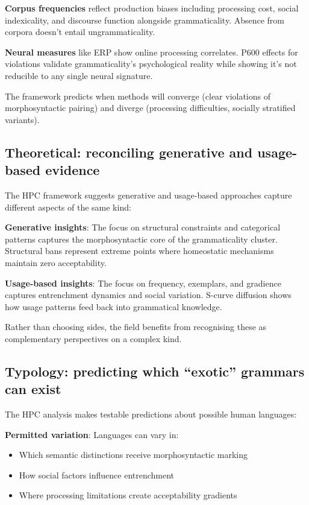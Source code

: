\documentclass[12pt]{article}
\begin{document}
\textbf{Corpus frequencies} reflect production biases including processing cost, social indexicality, and discourse function alongside grammaticality. Absence from corpora doesn't entail ungrammaticality.

\textbf{Neural measures} like ERP show online processing correlates. P600 effects for violations validate grammaticality's psychological reality while showing it's not reducible to any single neural signature.

The framework predicts when methods will converge (clear violations of morphosyntactic pairing) and diverge (processing difficulties, socially stratified variants).

\subsection{Theoretical: reconciling generative and usage-based evidence}

The HPC framework suggests generative and usage-based approaches capture different aspects of the same kind:

\textbf{Generative insights}: The focus on structural constraints and categorical patterns captures the morphosyntactic core of the grammaticality cluster. Structural bans represent extreme points where homeostatic mechanisms maintain zero acceptability.

\textbf{Usage-based insights}: The focus on frequency, exemplars, and gradience captures entrenchment dynamics and social variation. S-curve diffusion shows how usage patterns feed back into grammatical knowledge.

Rather than choosing sides, the field benefits from recognising these as complementary perspectives on a complex kind.

\subsection{Typology: predicting which \enquote{exotic} grammars can exist}

The HPC analysis makes testable predictions about possible human languages:

\textbf{Permitted variation}: Languages can vary in:
\begin{itemize}
    \item Which semantic distinctions receive morphosyntactic marking
    \item How social factors influence entrenchment  
    \item Where processing limitations create acceptability gradients
\end{itemize}
\end{document}
